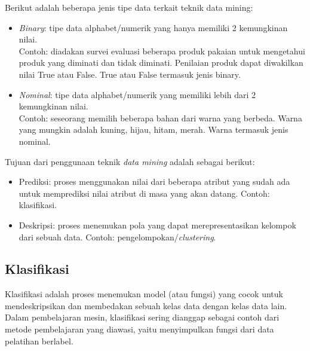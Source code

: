 \noindent Berikut adalah beberapa jenis tipe data terkait teknik data mining:

\begin{itemize}

\item \textit{Binary}: tipe data alphabet/numerik yang hanya memiliki 2 kemungkinan nilai.\\
Contoh: diadakan survei evaluasi beberapa produk pakaian untuk mengetahui produk yang diminati dan tidak diminati. Penilaian produk dapat diwakilkan nilai True atau False. True atau False termasuk jenis binary.

\item \textit{Nominal}: tipe data alphabet/numerik yang memiliki lebih dari 2 kemungkinan nilai.\\
Contoh: seseorang memilih beberapa bahan dari warna yang berbeda. Warna yang mungkin adalah kuning, hijau, hitam, merah. Warna termasuk jenis nominal.

\end{itemize}

\noindent Tujuan dari penggunaan teknik \textit{data mining} adalah sebagai berikut:

\begin{itemize}

\item Prediksi: proses menggunakan nilai dari beberapa atribut yang sudah ada untuk memprediksi nilai atribut di masa yang akan datang. Contoh: klasifikasi.

\item Deskripsi: proses menemukan pola yang dapat merepresentasikan kelompok dari sebuah data. Contoh: pengelompokan/\textit{clustering}.

\end{itemize}

\subsection{Klasifikasi} 
Klasifikasi adalah proses menemukan model (atau fungsi) yang cocok untuk mendeskripsikan dan membedakan sebuah kelas data dengan kelas data lain. Dalam pembelajaran mesin, klasifikasi sering dianggap sebagai contoh dari metode pembelajaran yang diawasi, yaitu menyimpulkan fungsi dari data pelatihan berlabel.\\

